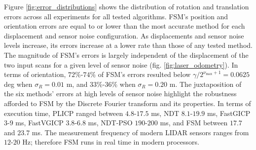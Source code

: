\begin{figure*}
  \vspace{0.2cm}
  \begin{framed}
  \vspace{-0.75cm}\hspace{-0.75cm}
    \subfloat{}
    \qquad \hspace{-1.25cm}
    \subfloat{}
    \vspace{-2.5cm}
    \caption{\small Distribution of orientation and position errors across a
             range of maximal positional and orientational displacements, for
             progressively larger sensor measurement noise levels sd. Each
             boxplot represents $10$ iterations over $\sum|D_k| \approx
             45$$\cdot$$10^3$ random scan pairs for each configuration,
             where $k=1,\dots,5$ is the dataset index. Dots signify mean
             errors. FSM's errors are largely independent of the initial
             displacement of scans for a given level of sensor noise}%
    \label{fig:error_distributions}%
\end{framed}
\end{figure*}

Figure \ref{fig:error_distributions} shows the distribution of rotation and
translation errors across all experiments for all tested algorithms.  FSM's
position and orientation errors are equal to or lower than the most accurate
method for each displacement and sensor noise configuration. As displacements
and sensor noise levels increase, its errors increase at a lower rate than
those of any tested method. The magnitude of FSM's errors is largely
independent of the displacement of the two input scans for a given level of
sensor noise (fig.  \ref{fig:laser_odometry}). In terms of orientation,
$72\%$-$74\%$ of FSM's errors resulted below $\gamma / 2^{\nu_{\max}+1} =
0.0625$ deg when $\sigma_R = 0.01$ m, and $33\%$-$36\%$ when $\sigma_R = 0.20$
m.  The juxtaposition of the six methods' errors at high levels of sensor noise
highlight the robustness afforded to FSM by the Discrete Fourier transform and
its properties.  In terms of execution time, PLICP ranged between $4.8$-$17.5$
ms, NDT $8.1$-$19.9$ ms, FastGICP $3$-$9$ ms, FastVGICP $3.8$-$6.8$ ms, NDT-PSO
$190$-$200$ ms, and FSM between $17.7$ and $23.7$ ms.  The measurement
frequency of modern LIDAR sensors ranges from $12$-$20$ Hz; therefore FSM runs
in real time in modern processors.
